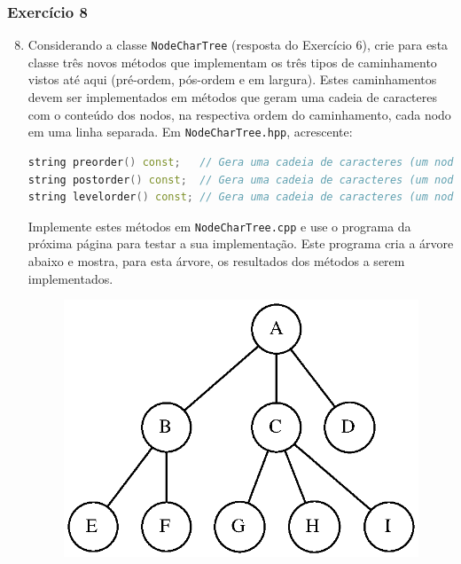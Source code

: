 \documentclass[aspectratio=169]{beamer}
\begin{document}
\begin{frame}[fragile]\frametitle{Exercício 8}
\begin{enumerate}
	\setcounter{enumi}{7}
	\footnotesize
	\item Considerando a classe \texttt{NodeCharTree} (resposta do Exercício 6), crie para esta classe três novos métodos que implementam os três tipos de caminhamento vistos até aqui (pré-ordem, pós-ordem e em largura). Estes caminhamentos devem ser implementados em métodos que geram uma cadeia de caracteres com o conteúdo dos nodos, na respectiva ordem do caminhamento, cada nodo em uma linha separada. Em \texttt{NodeCharTree.hpp}, acrescente:
\begin{lstlisting}[language=C++,basicstyle=\ttfamily\tiny]
string preorder() const;   // Gera uma cadeia de caracteres (um nodo por linha) em pré-ordem
string postorder() const;  // Gera uma cadeia de caracteres (um nodo por linha) em pós-ordem
string levelorder() const; // Gera uma cadeia de caracteres (um nodo por linha) em largura
\end{lstlisting}
Implemente estes métodos em \texttt{NodeCharTree.cpp} e use o programa da próxima página para testar a sua implementação. Este programa cria a árvore abaixo e mostra, para esta árvore, os resultados dos métodos a serem implementados.
\begin{figure}[h]
	\centering
	\includegraphics[height=0.3\paperheight]{imagens/arvore_d.eps}
\end{figure}
\end{enumerate}
\end{frame}
\end{document}
